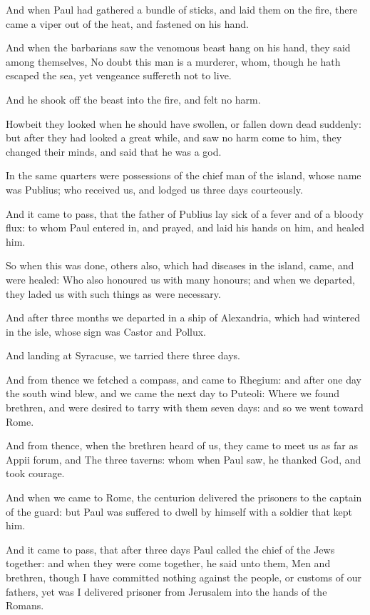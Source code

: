 \Verse And when Paul had gathered a bundle of sticks, and laid them on the fire, there came a viper out of the heat, and fastened on his hand.

\Verse And when the barbarians saw the venomous beast hang on his hand, they said among themselves, No doubt this man is a murderer, whom, though he hath escaped the sea, yet vengeance suffereth not to live.

\Verse And he shook off the beast into the fire, and felt no harm.

\Verse Howbeit they looked when he should have swollen, or fallen down dead suddenly: but after they had looked a great while, and saw no harm come to him, they changed their minds, and said that he was a god.

\Verse In the same quarters were possessions of the chief man of the island, whose name was Publius; who received us, and lodged us three days courteously.

\Verse And it came to pass, that the father of Publius lay sick of a fever and of a bloody flux: to whom Paul entered in, and prayed, and laid his hands on him, and healed him.

\Verse So when this was done, others also, which had diseases in the island, came, and were healed: \Verse Who also honoured us with many honours; and when we departed, they laded us with such things as were necessary.

\Verse And after three months we departed in a ship of Alexandria, which had wintered in the isle, whose sign was Castor and Pollux.

\Verse And landing at Syracuse, we tarried there three days.

\Verse And from thence we fetched a compass, and came to Rhegium: and after one day the south wind blew, and we came the next day to Puteoli: \Verse Where we found brethren, and were desired to tarry with them seven days: and so we went toward Rome.

\Verse And from thence, when the brethren heard of us, they came to meet us as far as Appii forum, and The three taverns: whom when Paul saw, he thanked God, and took courage.

\Verse And when we came to Rome, the centurion delivered the prisoners to the captain of the guard: but Paul was suffered to dwell by himself with a soldier that kept him.

\Verse And it came to pass, that after three days Paul called the chief of the Jews together: and when they were come together, he said unto them, Men and brethren, though I have committed nothing against the people, or customs of our fathers, yet was I delivered prisoner from Jerusalem into the hands of the Romans.

